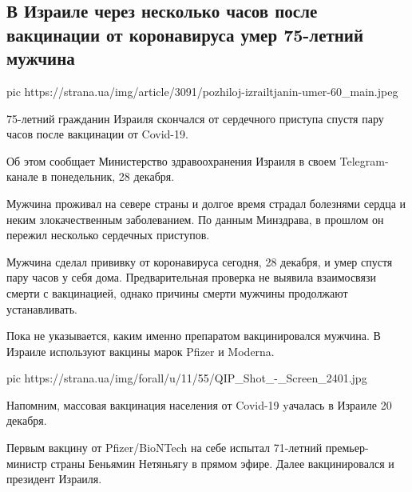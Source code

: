  
 
 
 
 
 
\subsection{В Израиле через несколько часов после вакцинации от коронавируса умер 75-летний мужчина}
\label{sec:27_12_2020.news.ua.strana.2.izrael_death_vaccine_covid}

\ifcmt
pic https://strana.ua/img/article/3091/pozhiloj-izrailtjanin-umer-60_main.jpeg
\fi

75-летний гражданин Израиля скончался от сердечного приступа спустя пару часов
после вакцинации от Covid-19.

Об этом сообщает Министерство здравоохранения Израиля в своем Telegram-канале в
понедельник, 28 декабря.

Мужчина проживал на севере страны и долгое время страдал болезнями сердца и
неким злокачественным заболеванием. По данным Минздрава, в прошлом он пережил
несколько сердечных приступов.

Мужчина сделал прививку от коронавируса сегодня, 28 декабря, и умер спустя пару
часов у себя дома. Предварительная проверка не выявила взаимосвязи смерти с
вакцинацией, однако причины смерти мужчины продолжают устанавливать. 

Пока не указывается, каким именно препаратом вакцинировался мужчина. В Израиле
используют вакцины марок Pfizer и Moderna.

\ifcmt
pic https://strana.ua/img/forall/u/11/55/QIP_Shot_-_Screen_2401.jpg
\fi

Напомним, массовая вакцинация населения от Covid-19 yачалась в Израиле 20
декабря.

Первым вакцину от Pfizer/BioNTech на себе испытал 71-летний премьер-министр
страны Беньямин Нетяньягу в прямом эфире. Далее вакцинировался и президент
Израиля.

